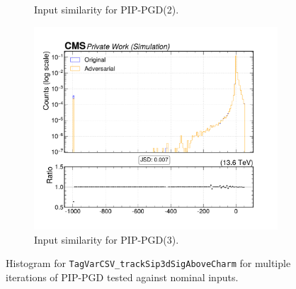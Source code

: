\begin{figure}[htbp]
\begin{subfigure}[t]{0.32\textwidth}
    \caption*{Input similarity for PIP-PGD(2).}
  \end{subfigure}\hfill
  \begin{subfigure}[t]{0.32\textwidth}
    \includegraphics[width=\linewidth]{media/output/features/compare/combined_it_3/cmp_global_features_TagVarCSV_trackSip3dSigAboveCharm.pdf}
    \caption*{Input similarity for PIP-PGD(3).}
  \end{subfigure}

  \caption*{Histogram for \texttt{TagVarCSV\_trackSip3dSigAboveCharm} for multiple iterations of PIP-PGD tested against nominal inputs.}
  \label{fig:combined_input_TagVarCSV_trackSip3dSigAboveCharm}
\end{figure}

